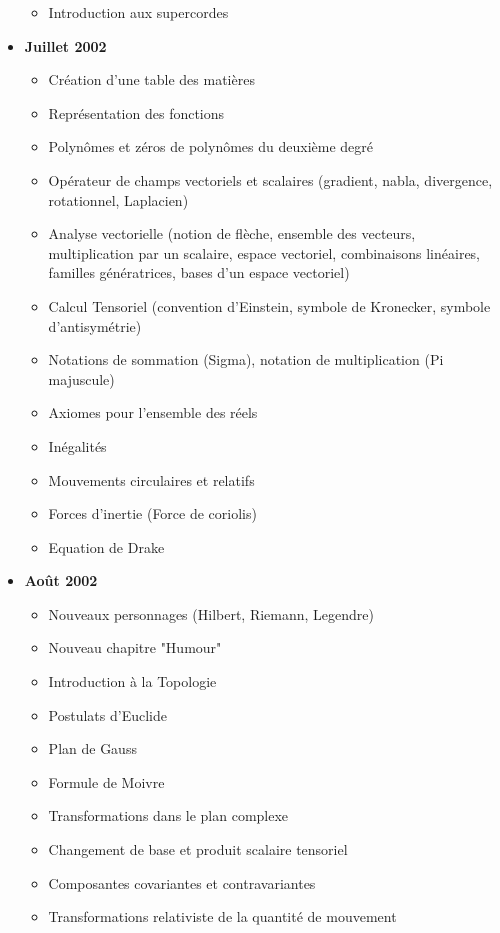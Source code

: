 \begin{itemize}
\begin{itemize}[noitemsep]
				\item Introduction aux supercordes
			\end{itemize}
		\item \textbf{Juillet 2002}
			\begin{itemize}[noitemsep]
				\item Création d'une table des matières
				\item Représentation des fonctions
				\item Polynômes et zéros de polynômes du deuxième degré
				\item Opérateur de champs vectoriels et scalaires (gradient, nabla, divergence, rotationnel, Laplacien)
				\item Analyse vectorielle (notion de flèche, ensemble des vecteurs, multiplication par un scalaire, espace vectoriel, combinaisons linéaires, familles génératrices, bases d'un espace vectoriel)
				\item Calcul Tensoriel (convention d'Einstein, symbole de Kronecker, symbole d'antisymétrie)
				\item Notations de sommation (Sigma), notation de multiplication (Pi majuscule)
				\item Axiomes pour l'ensemble des réels
				\item Inégalités
				\item Mouvements circulaires et relatifs
				\item Forces d'inertie (Force de coriolis)
				\item Equation de Drake
			\end{itemize}
		\item \textbf{Août 2002}
			\begin{itemize}[noitemsep]
				\item Nouveaux personnages (Hilbert, Riemann, Legendre)
				\item Nouveau chapitre "Humour"
				\item Introduction à la Topologie
				\item Postulats d'Euclide
				\item Plan de Gauss
				\item Formule de Moivre
				\item Transformations dans le plan complexe
				\item Changement de base et produit scalaire tensoriel
				\item Composantes covariantes et contravariantes
				\item Transformations relativiste de la quantité de mouvement

\end{itemize}
\end{itemize}
